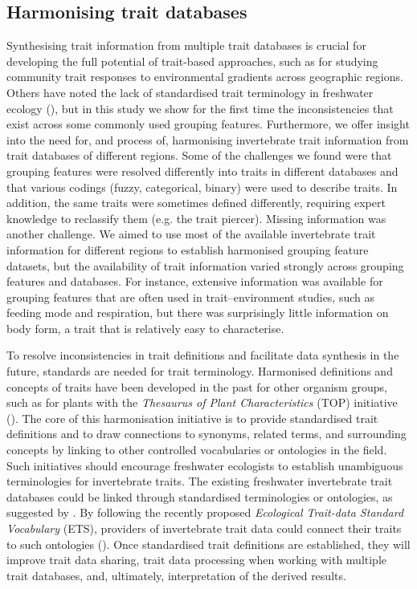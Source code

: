 \documentclass[12pt]{article}
\begin{document}
\subsection*{Harmonising trait databases}

Synthesising trait information from multiple trait databases is crucial for developing the full potential of trait-based approaches, such as for studying community trait responses to environmental gradients across geographic regions. Others have noted the lack of standardised trait terminology in freshwater ecology (\cite{baird_toward_2011, brink_traits-based_2011}), but in this study we show for the first time the inconsistencies that exist across some commonly used grouping features. Furthermore, we offer insight into the need for, and process of, harmonising invertebrate trait information from trait databases of different regions. Some of the challenges we found were that grouping features were resolved differently into traits in different databases and that various codings (fuzzy, categorical, binary) were used to describe traits. In addition, the same traits were sometimes defined differently, requiring expert knowledge to reclassify them (e.g. the trait piercer). Missing information was another challenge. We aimed to use most of the available invertebrate trait information for different regions to establish harmonised grouping feature datasets, but the availability of trait information varied strongly across grouping features and databases. For instance, extensive information was available for grouping features that are often used in trait–environment studies, such as feeding mode and respiration, but there was surprisingly little information on body form, a trait that is relatively easy to characterise.

To resolve inconsistencies in trait definitions and facilitate data synthesis in the future, standards are needed for trait terminology. Harmonised definitions and concepts of traits have been developed in the past for other organism groups, such as for plants with the \textit{Thesaurus of Plant Characteristics} (TOP) initiative (\cite{garnier_towards_2017}). The core of this harmonisation initiative is to provide standardised trait definitions and to draw connections to synonyms, related terms, and surrounding concepts by linking to other controlled vocabularies or ontologies in the field. Such initiatives should encourage freshwater ecologists to establish unambiguous terminologies for invertebrate traits. The existing freshwater invertebrate trait databases could be linked through standardised terminologies or ontologies, as suggested by \citet{baird_toward_2011}. By following the recently proposed \textit{Ecological Trait-data Standard Vocabulary} (ETS), providers of invertebrate trait data could connect their traits to such ontologies (\cite{schneider_towards_2019}). Once standardised trait definitions are established, they will improve trait data sharing, trait data processing when working with multiple trait databases, and, ultimately, interpretation of the derived results. 
\end{document}

